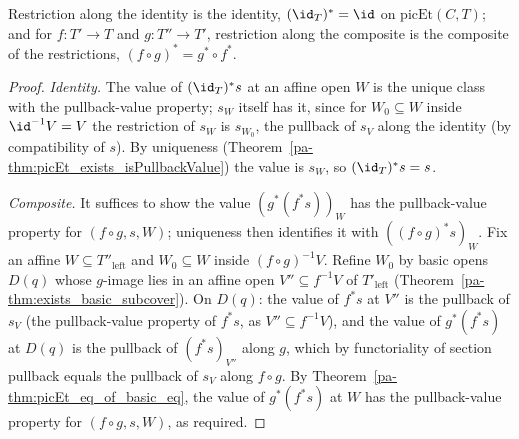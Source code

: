 \begin{theorem}
  \label{pa-thm:picEtMap_functor_laws}
  \leanok

  Restriction along the identity is the identity, \((\id_T)^{*} = \id\) on \(\mathrm{picEt}(C, T)\);
  and for \(f \colon T' \to T\) and \(g \colon T'' \to T'\), restriction along the composite is the
  composite of the restrictions, \((f \circ g)^{*} = g^{*} \circ f^{*}\).
\end{theorem}
\begin{proof}
  \leanok
  \emph{Identity.} The value of \((\id_T)^{*}s\) at an affine open \(W\) is the unique class with
  the pullback-value property; \(s_W\) itself has it, since for \(W_0 \subseteq W\) inside
  \(\id^{-1}V = V\) the restriction of \(s_W\) is \(s_{W_0}\), the pullback of \(s_V\) along the
  identity (by compatibility of \(s\)). By uniqueness (Theorem~\ref{pa-thm:picEt_exists_isPullbackValue})
  the value is \(s_W\), so \((\id_T)^{*}s = s\).

  \emph{Composite.} It suffices to show the value \((g^{*}(f^{*}s))_W\) has the pullback-value
  property for \((f \circ g, s, W)\); uniqueness then identifies it with \(((f \circ g)^{*}s)_W\).
  Fix an affine \(W \subseteq T''_{\mathrm{left}}\) and \(W_0 \subseteq W\) inside
  \((f \circ g)^{-1}V\). Refine \(W_0\) by basic opens \(D(q)\) whose \(g\)-image lies in an affine
  open \(V'' \subseteq f^{-1}V\) of \(T'_{\mathrm{left}}\)
  (Theorem~\ref{pa-thm:exists_basic_subcover}). On \(D(q)\): the value of \(f^{*}s\) at \(V''\) is the
  pullback of \(s_V\) (the pullback-value property of \(f^{*}s\), as \(V'' \subseteq f^{-1}V\)), and
  the value of \(g^{*}(f^{*}s)\) at \(D(q)\) is the pullback of \((f^{*}s)_{V''}\) along \(g\), which
  by functoriality of section pullback equals the pullback of \(s_V\) along \(f \circ g\). By
  Theorem~\ref{pa-thm:picEt_eq_of_basic_eq}, the value of \(g^{*}(f^{*}s)\) at \(W\) has the
  pullback-value property for \((f \circ g, s, W)\), as required.
\end{proof}

